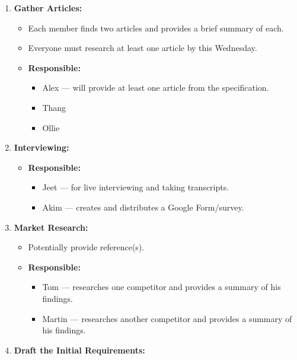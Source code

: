 \documentclass[11pt]{article}
\begin{document}
\begin{enumerate}
\def\labelenumi{\arabic{enumi}.}
\tightlist
\item
  \textbf{Gather Articles:}

  \begin{itemize}
  \tightlist
  \item
    Each member finds two articles and provides a brief summary of each.
  \item
    Everyone must research at least one article by this Wednesday.
  \item
    \textbf{Responsible:}

    \begin{itemize}
    \tightlist
    \item
      Alex --- will provide at least one article from the specification.
    \item
      Thang
    \item
      Ollie
    \end{itemize}
  \end{itemize}
\item
  \textbf{Interviewing:}

  \begin{itemize}
  \tightlist
  \item
    \textbf{Responsible:}

    \begin{itemize}
    \tightlist
    \item
      Jeet --- for live interviewing and taking transcripts.
    \item
      Akim --- creates and distributes a Google Form/survey.
    \end{itemize}
  \end{itemize}
\item
  \textbf{Market Research:}

  \begin{itemize}
  \tightlist
  \item
    Potentially provide reference(s).
  \item
    \textbf{Responsible:}

    \begin{itemize}
    \tightlist
    \item
      Tom --- researches one competitor and provides a summary of his
      findings.
    \item
      Martin --- researches another competitor and provides a summary of
      his findings.
    \end{itemize}
  \end{itemize}
\item
  \textbf{Draft the Initial Requirements:}


\end{enumerate}
\end{document}
